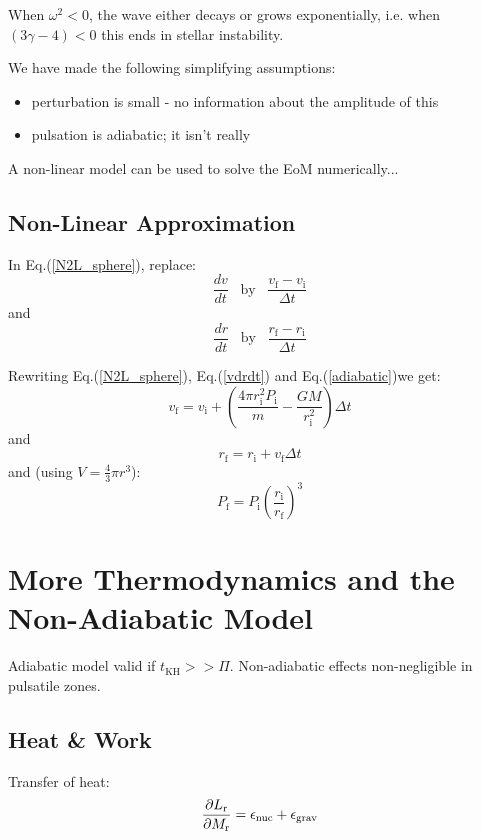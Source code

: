 \documentclass{spy}
\begin{document}
When \(\omega^2 < 0\), the wave either decays or grows exponentially, i.e. when \((3\gamma - 4) < 0\) this ends in stellar instability.  

We have made the following simplifying assumptions:
\begin{itemize}
    \item perturbation is small - no information about the amplitude of this
    \item pulsation is adiabatic; it isn't really
\end{itemize}

A non-linear model can be used to solve the EoM numerically...

\subsection{Non-Linear Approximation}
In Eq.(\ref{N2L_sphere}), replace:
\begin{equation}
    \frac{dv}{dt} \;\;\; \text{by}  \;\;\; \frac{v_\mathrm{f} - v_\mathrm{i}}{\Delta t}
\end{equation}
and
\begin{equation}
     \frac{dr}{dt} \;\;\; \text{by}  \;\;\; \frac{r_\mathrm{f} - r_\mathrm{i}}{\Delta t}
\end{equation}

Rewriting Eq.(\ref{N2L_sphere}), Eq.(\ref{vdrdt}) and Eq.(\ref{adiabatic})we get:
\begin{equation}
     v_\mathrm{f} = v_\mathrm{i} + \left(\frac{4\pi r^2_\mathrm{i} P_\mathrm{i}}{m} - \frac{GM}{r^2_\mathrm{i}}\right) \Delta t
\end{equation}
and
\begin{equation}
     r_\mathrm{f} = r_\mathrm{i} + v_\mathrm{f} \Delta t
\end{equation}
and (using \(V = \frac{4}{3} \pi r^3\)):
\begin{equation}
     P_\mathrm{f} = P_\mathrm{i} \left(\frac{r_\mathrm{i}}{r_\mathrm{f}} \right)^3
\end{equation}


\section{More Thermodynamics and the Non-Adiabatic Model}
Adiabatic model valid if \(t_\mathrm{KH}>>\Pi\). Non-adiabatic effects non-negligible in pulsatile zones. 

\subsection{Heat \& Work}
Transfer of heat:
\begin{equation}
    \pdv{L_\mathrm{r}}{M_\mathrm{r}} = \epsilon_\mathrm{nuc} + \epsilon_\mathrm{grav}
\end{equation}
\end{document}
